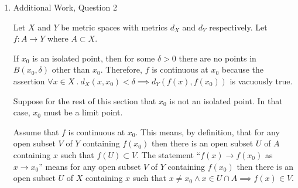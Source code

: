 \documentclass[letterpaper,10pt]{article}
\begin{document}
\begin{enumerate}
	\item Additional Work, Question 2

	Let $X$ and $Y$ be metric spaces with metrics $d_X$ and $d_Y$ respectively. Let $f : A \rightarrow Y$ where $A \subset X$. 

	If $x_0$ is an isolated point, then for some $\delta > 0$ there are no points in $B(x_0, \delta)$ other than $x_0$. Therefore, $f$ is continuous at $x_0$ because the assertion $\forall x \in X\ .\ d_X(x, x_0) < \delta \implies d_Y(f(x), f(x_0))$ is vacuously true.

	Suppose for the rest of this section that $x_0$ is not an isolated point. In that case, $x_0$ must be a limit point.

	Assume that $f$ is continuous at $x_0$. This means, by definition, that for any open subset $V$ of $Y$ containing $f(x_0)$ then there is an open subset $U$ of $A$ containing $x$ such that $f(U) \subset V$. The statement ``$f(x) \to f(x_0)$ as $x \to x_0$'' means for any open subset $V$ of $Y$ containing $f(x_0)$ then there is an open subset $U$ of $X$ containing $x$ such that $x \neq x_0 \wedge x \in U \cap A \implies f(x) \in V$.



\end{enumerate}
\end{document}
